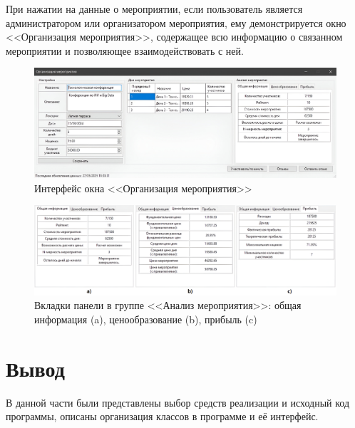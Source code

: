 При нажатии на данные о мероприятии, если пользователь является администратором или организатором мероприятия, ему демонстрируется окно <<Организация мероприятия>>, содержащее всю информацию о связанном мероприятии и позволяющее взаимодействовать с ней.
\begin{figure}[h!]
	\centering
	\includegraphics[width=1\textwidth]{images/app-event-organization.png}
	\caption{Интерфейс окна <<Организация мероприятия>>} 
	\label{fig:app-event-organization} 
\end{figure}
\begin{figure}[h!]
	\centering
	\includegraphics[width=1\textwidth]{images/app-event-analyze.png}
	\caption{Вкладки панели в группе <<Анализ мероприятия>>: общая информация (a), ценообразование (b), прибыль (c)} 
	\label{fig:app-event-analyze} 
\end{figure}

\section{Вывод}

В данной части были представлены выбор средств реализации и исходный код программы, описаны организация классов в программе и её интерфейс.

\clearpage
